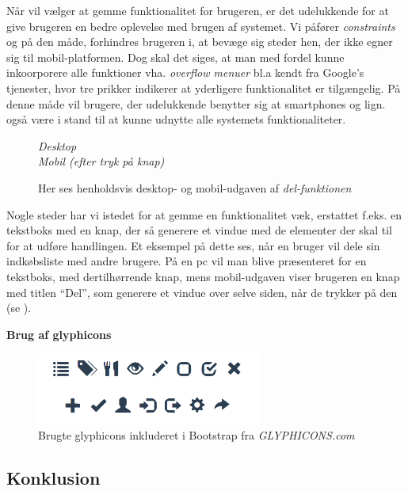 Når vil vælger at gemme funktionalitet for brugeren, er det udelukkende for at give brugeren en bedre oplevelse med brugen af systemet.
Vi påfører \textit{constraints} og på den måde, forhindres brugeren i, at bevæge sig steder hen, der ikke egner sig til mobil-platformen.
Dog skal det siges, at man med fordel kunne inkoorporere alle funktioner vha. \textit{overflow menuer} bl.a kendt fra Google's tjenester, hvor tre prikker indikerer at yderligere funktionalitet er tilgængelig.
På denne måde vil brugere, der udelukkende benytter sig at smartphones og lign. også være i stand til at kunne udnytte alle systemets funktionaliteter.

\begin{figure}
\vspace{-30pt}
\begin{center}
\textit{Desktop}
\\
\vspace{10pt}
\textit{Mobil (efter tryk på knap)}
\end{center}
\vspace{-10pt}
\caption{Her ses henholdsvis desktop- og mobil-udgaven af \textit{del-funktionen}}\label{ss:share_diffs}
\end{figure}
Nogle steder har vi istedet for at gemme en funktionalitet væk, erstattet f.eks. en tekstboks med en knap, der så generere et vindue med de elementer der skal til for at udføre handlingen. 
Et eksempel på dette ses, når en bruger vil dele sin indkøbsliste med andre brugere.
På en pc vil man blive præsenteret for en tekstboks, med dertilhørrende knap, mens mobil-udgaven viser brugeren en knap med titlen ``Del'', som generere et vindue over selve siden, når de trykker på den (se  ).


\textbf{Brug af glyphicons}\hfill\\
\begin{figure}[h]
\centering
\includegraphics[width=0.66\textwidth]{images/Images/glyphicons.png}
\caption{Brugte glyphicons inkluderet i Bootstrap fra \textit{GLYPHICONS.com}}
\end{figure}
\subsection{Konklusion}